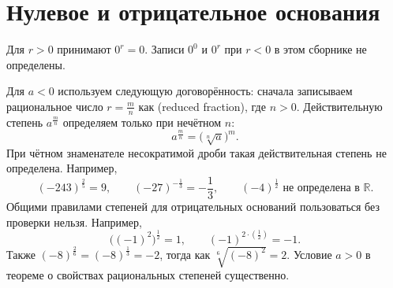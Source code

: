 \section{Нулевое и отрицательное основания}
Для \(r>0\) принимают \(0^r=0\). Записи \(0^0\) и \(0^r\) при \(r<0\) в этом сборнике не определены.

Для \(a<0\) используем следующую договорённость: сначала записываем рациональное число \(r=\frac mn\) как  (reduced fraction), где \(n>0\). Действительную степень \(a^{\frac mn}\) определяем только при нечётном \(n\):
\[
a^{\frac mn}=\bigl(\sqrt[n]a\bigr)^m.
\]
При чётном знаменателе несократимой дроби такая действительная степень не определена. Например,
\[
(-243)^{\frac25}=9,\qquad
(-27)^{-\frac13}=-\frac13,\qquad
(-4)^{\frac12}\text{ не определена в }\mathbb R.
\]
Общими правилами степеней для отрицательных оснований пользоваться без проверки нельзя. Например,
\[
\bigl((-1)^2\bigr)^{\frac12}=1,
\qquad
(-1)^{2\cdot(\frac12)}=-1.
\]
Также \((-8)^{\frac26}=(-8)^{\frac13}=-2\), тогда как \(\sqrt[6]{(-8)^2}=2\). Условие \(a>0\) в теореме о свойствах рациональных степеней существенно.

